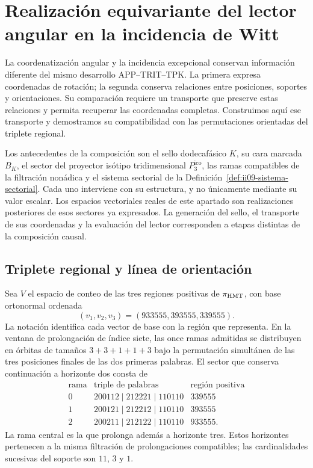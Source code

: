 \section{Realización equivariante del lector angular en la incidencia de Witt}
\label{sec:ii-enlace-angular-witt}

La coordenatización angular y la incidencia excepcional conservan información diferente
del mismo desarrollo APP--TRIT--TPK. La primera expresa coordenadas de
rotación; la segunda conserva relaciones entre posiciones, soportes y
orientaciones. Su comparación requiere un transporte que preserve estas
relaciones y permita recuperar las coordenadas completas. Construimos aquí
ese transporte y demostramos su compatibilidad con las permutaciones
orientadas del triplete regional.

Los antecedentes de la composición son el sello dodecafásico \(K\), su
cara marcada \(B_K\), el sector del proyector isótipo tridimensional
\(P_3^{\mathrm{ico}}\), las ramas
compatibles de la filtración nonádica y el sistema sectorial de la
Definición~\ref{def:ii09-sistema-sectorial}. Cada uno interviene con su
estructura, y no únicamente mediante su valor escalar. Los espacios
vectoriales reales de este apartado son realizaciones posteriores de esos
sectores ya expresados. La generación del sello, el transporte de sus
coordenadas y la evaluación del lector corresponden a etapas distintas de
la composición causal.

\subsection{Triplete regional y línea de orientación}

Sea \(V\) el espacio de conteo de las tres regiones positivas de
\(\pi_{\rm HMT}\), con base ortonormal ordenada
\[
 (v_1,v_2,v_3)=(933555,393555,339555).
\]
La notación identifica cada vector de base con la región que representa.
En la ventana de prolongación de índice siete, las once ramas admitidas
se distribuyen en órbitas de tamaños \(3+3+1+1+3\) bajo la permutación
simultánea de las tres posiciones finales de las dos primeras palabras.
El sector que conserva continuación a horizonte dos consta de
\[
\begin{array}{c|c|c}
\text{rama}&\text{triple de palabras}&\text{región positiva}\\ \hline
0&200112\mid212221\mid110110&339555\\
1&200121\mid212212\mid110110&393555\\
2&200211\mid212122\mid110110&933555.
\end{array}
\]
La rama central es la que prolonga además a horizonte tres. Estos
horizontes pertenecen a la misma filtración de prolongaciones compatibles;
las cardinalidades sucesivas del soporte son \(11\), \(3\) y \(1\).

